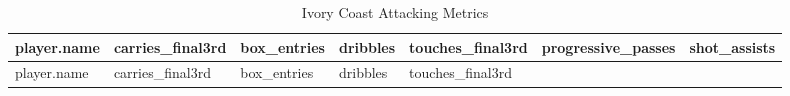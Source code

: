 \documentclass[
  11pt,
  letterpaper,
  DIV=11,
  numbers=noendperiod]{scrartcl}
\begin{document}
\begin{longtable}[]{@{}
  >{\raggedright\arraybackslash}p{}
  >{\raggedleft\arraybackslash}p{}
  >{\raggedleft\arraybackslash}p{}
  >{\raggedleft\arraybackslash}p{}
  >{\raggedleft\arraybackslash}p{}
  >{\raggedleft\arraybackslash}p{}
  >{\raggedleft\arraybackslash}p{}@{}}
\caption{Ivory Coast Attacking Metrics}\tabularnewline
\toprule\noalign{}
\begin{minipage}[b]{\linewidth}\raggedright
player.name
\end{minipage} & \begin{minipage}[b]{\linewidth}\raggedleft
carries\_final3rd
\end{minipage} & \begin{minipage}[b]{\linewidth}\raggedleft
box\_entries
\end{minipage} & \begin{minipage}[b]{\linewidth}\raggedleft
dribbles
\end{minipage} & \begin{minipage}[b]{\linewidth}\raggedleft
touches\_final3rd
\end{minipage} & \begin{minipage}[b]{\linewidth}\raggedleft
progressive\_passes
\end{minipage} & \begin{minipage}[b]{\linewidth}\raggedleft
shot\_assists
\end{minipage} \\
\midrule\noalign{}
\endfirsthead
\toprule\noalign{}
\begin{minipage}[b]{\linewidth}\raggedright
player.name
\end{minipage} & \begin{minipage}[b]{\linewidth}\raggedleft
carries\_final3rd
\end{minipage} & \begin{minipage}[b]{\linewidth}\raggedleft
box\_entries
\end{minipage} & \begin{minipage}[b]{\linewidth}\raggedleft
dribbles
\end{minipage} & \begin{minipage}[b]{\linewidth}\raggedleft
touches\_final3rd
\end{minipage} & \begin{minipage}[b]{\linewidth}\raggedleft

\end{minipage}
\end{longtable}
\end{document}
